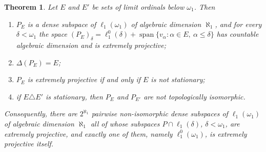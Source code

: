 \documentclass[12pt]{article}
\newtheorem{theorem}{Theorem}[section]
\newcommand{\lo}[1]{\ell_1^0(#1)}
\newcommand{\ellone}[1]{\ell_1(#1)}
\newcommand{\Lin}{\operatorname{span}}
\begin{document}
\begin{theorem}\label{LadderSpacesOnE} Let $E$ and $E'$ be sets of limit
    ordinals below $\omega_1$. Then
    \begin{enumerate}[label = (\roman*)]
        \item $P_E$ is a dense subspace of $\ellone{\omega_1}$ of algebraic
              dimension $\aleph_1$, and for every $\delta<\omega_1$ the space
              $(P_E)_\delta=\lo{\delta}+\Lin\{v_\alpha:\alpha\in E,\ \alpha\leq\delta\}$
              has countable algebraic dimension and is extremely projective;
        \item $\Delta(P_E)=E$;
        \item $P_E$ is extremely projective if and only if $E$ is not
              stationary;
        \item if $E\triangle E'$ is stationary, then $P_E$ and $P_{E'}$ are
              not topologically isomorphic.
    \end{enumerate}
    Consequently, there are $2^{\aleph_1}$ pairwise non-isomorphic dense
    subspaces of $\ellone{\omega_1}$ of algebraic dimension $\aleph_1$ all of
    whose subspaces $P\cap\ellone{\delta}$, $\delta<\omega_1$, are extremely
    projective, and exactly one of them, namely $\lo{\omega_1}$, is
    extremely projective itself.
\end{theorem}
\end{document}

